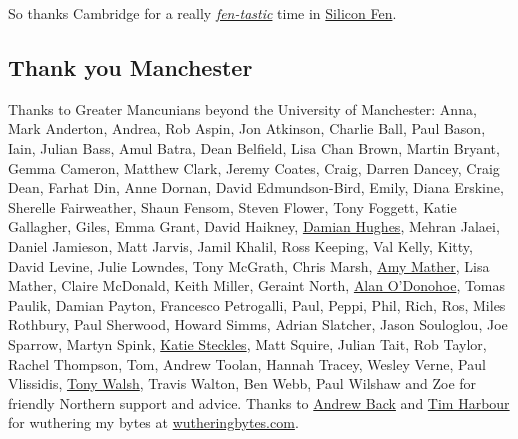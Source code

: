 \documentclass[
]{book}
\begin{document}
So thanks Cambridge for a really \emph{\href{https://en.wikipedia.org/wiki/The_Fens}{fen-tastic}} time in \href{https://en.wikipedia.org/wiki/Silicon_Fen}{Silicon Fen}. 🙏

\hypertarget{manchester}{%
\subsection{Thank you Manchester}\label{manchester}}

Thanks to Greater Mancunians beyond the University of Manchester: Anna, Mark Anderton, Andrea, Rob Aspin, Jon Atkinson, Charlie Ball, Paul Bason, Iain, Julian Bass, Amul Batra, Dean Belfield, Lisa Chan Brown, Martin Bryant, Gemma Cameron, Matthew Clark, Jeremy Coates, Craig, Darren Dancey, Craig Dean, Farhat Din, Anne Dornan, David Edmundson-Bird, Emily, Diana Erskine, Sherelle Fairweather, Shaun Fensom, Steven Flower, Tony Foggett, Katie Gallagher, Giles, Emma Grant, David Haikney, \href{https://liquidthinker.com}{Damian Hughes}, Mehran Jalaei, Daniel Jamieson, Matt Jarvis, Jamil Khalil, Ross Keeping, Val Kelly, Kitty, David Levine, Julie Lowndes, Tony McGrath, Chris Marsh, \href{https://twitter.com/MiniGirlGeek}{Amy Mather}, Lisa Mather, Claire McDonald, Keith Miller, Geraint North, \href{https://twitter.com/teknoteacher}{Alan O'Donohoe}, Tomas Paulik, Damian Payton, Francesco Petrogalli, Paul, Peppi, Phil, Rich, Ros, Miles Rothbury, Paul Sherwood, Howard Simms, Adrian Slatcher, Jason Souloglou, Joe Sparrow, Martyn Spink, \href{https://www.katiesteckles.co.uk/}{Katie Steckles}, Matt Squire, Julian Tait, Rob Taylor, Rachel Thompson, Tom, Andrew Toolan, Hannah Tracey, Wesley Verne, Paul Vlissidis, \href{https://en.wikipedia.org/wiki/Tony_Walsh_(poet)}{Tony Walsh}, Travis Walton, Ben Webb, Paul Wilshaw and Zoe for friendly Northern support and advice. Thanks to \href{https://twitter.com/9600}{Andrew Back} and \href{https://twitter.com/timharbour}{Tim Harbour} for wuthering my bytes at \href{https://wutheringbytes.com/}{wutheringbytes.com}.
\end{document}
